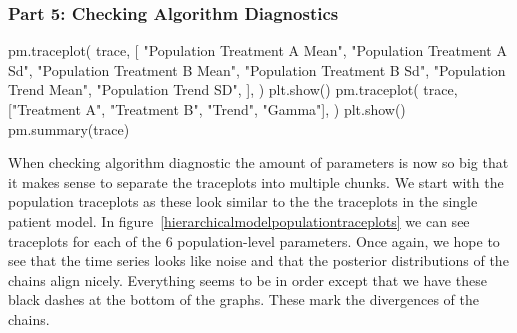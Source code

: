 \documentclass[12pt,a4paper,leqno]{report}
\theoremstyle{plain}
\theoremstyle{definition}
\theoremstyle{remark}
\begin{document}
\subsubsection*{Part 5: Checking Algorithm Diagnostics}

\bigskip
\begin{pyverbatim}[][fontsize=\footnotesize]
    pm.traceplot(
        trace,
        [
            "Population Treatment A Mean",
            "Population Treatment A Sd",
            "Population Treatment B Mean",
            "Population Treatment B Sd",
            "Population Trend Mean",
            "Population Trend SD",
        ],
    )
    plt.show()
    pm.traceplot(
        trace, ["Treatment A", "Treatment B", "Trend", "Gamma"],
    )
    plt.show()
    pm.summary(trace)
\end{pyverbatim}
\bigskip

When checking algorithm diagnostic the amount of parameters is now so big that it makes
sense to separate the traceplots into multiple chunks. We start with the population
traceplots as these look similar to the the traceplots in the single patient
model. In figure\ \ref{hierarchicalmodelpopulationtraceplots} we can see traceplots for each of
the 6 population-level parameters. Once again, we hope to see that the time series looks
like noise and that the posterior distributions of the chains align nicely. Everything
seems to be in order except that we have these black dashes at the bottom of the graphs.
These mark the divergences of the chains.

\end{document}
